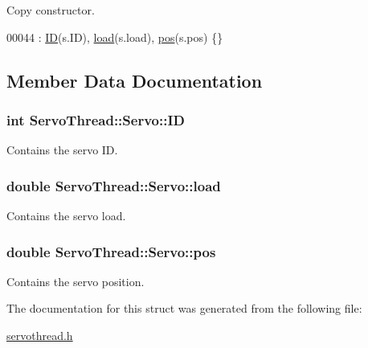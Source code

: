 Copy constructor. 


\begin{DoxyCode}
00044 : \hyperlink{struct_servo_thread_1_1_servo_a06b514c42113aa85fd1703fc88fca7ce}{ID}(s.ID), \hyperlink{struct_servo_thread_1_1_servo_ae378d77acf16b306649c87fdb8df677e}{load}(s.load), \hyperlink{struct_servo_thread_1_1_servo_a9fa0aa56944b9b0bb9d66303d5bd4b59}{pos}(s.pos) \{\}
\end{DoxyCode}


\subsection{Member Data Documentation}
\hypertarget{struct_servo_thread_1_1_servo_a06b514c42113aa85fd1703fc88fca7ce}{}
\subsubsection[{I\+D}]{\setlength{\rightskip}{0pt plus 5cm}int Servo\+Thread\+::\+Servo\+::\+I\+D}\label{struct_servo_thread_1_1_servo_a06b514c42113aa85fd1703fc88fca7ce}


Contains the servo I\+D. 

\hypertarget{struct_servo_thread_1_1_servo_ae378d77acf16b306649c87fdb8df677e}{}
\subsubsection[{load}]{\setlength{\rightskip}{0pt plus 5cm}double Servo\+Thread\+::\+Servo\+::load}\label{struct_servo_thread_1_1_servo_ae378d77acf16b306649c87fdb8df677e}


Contains the servo load. 

\hypertarget{struct_servo_thread_1_1_servo_a9fa0aa56944b9b0bb9d66303d5bd4b59}{}
\subsubsection[{pos}]{\setlength{\rightskip}{0pt plus 5cm}double Servo\+Thread\+::\+Servo\+::pos}\label{struct_servo_thread_1_1_servo_a9fa0aa56944b9b0bb9d66303d5bd4b59}


Contains the servo position. 



The documentation for this struct was generated from the following file\+:\begin{DoxyCompactItemize}
\item 
\hyperlink{servothread_8h}{servothread.\+h}\end{DoxyCompactItemize}
